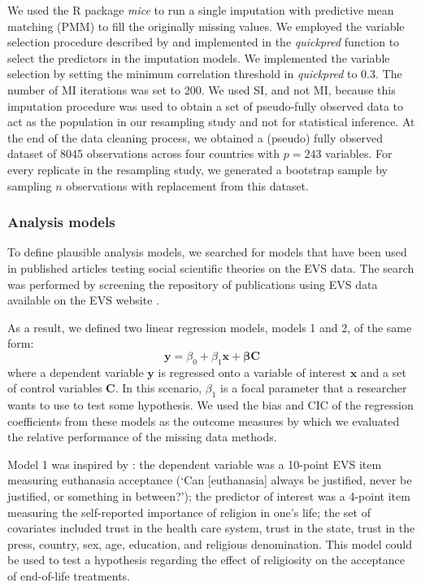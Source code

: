 	We used the R package \emph{mice} to run a single imputation with predictive mean matching (PMM) to fill the originally missing values.
	We employed the variable selection procedure described by
	\citet[][pp. 687–688]{vanBuurenEtAl:1999} and implemented in the \emph{quickpred} function to select the predictors in the imputation models. We implemented the variable selection by setting the minimum correlation threshold in \emph{quickpred} to 0.3.
	The number of MI iterations was set to 200.
	We used SI, and not MI, because this imputation procedure was used to obtain a set of pseudo-fully observed data to act as the population in our resampling study and not for statistical inference.
	At the end of the data cleaning process, we obtained a (pseudo) fully observed dataset of 8045 observations across four countries with $p = 243$ variables.
	For every replicate in the resampling study, we generated a bootstrap sample by sampling $n$ observations with replacement from this dataset.

\subsubsection{Analysis models}

	To define plausible analysis models, we searched for models that have been used in published articles
	testing social scientific theories on the EVS data.
	The search was performed by screening the repository of publications using EVS data available on the EVS 
	website \citep{EVSbib}.

	As a result, we defined two linear regression models, models 1 and 2, of the same form:
%	
	\begin{equation}
		\bm{y} = \beta_{0} + \beta_{1} \bm{x} + \bm{\beta} \bm{C}  \label{eqn:lm}
	\end{equation}
%
	where a dependent variable $\bm{y}$ is regressed onto a variable of interest $\bm{x}$ and a set of control variables $\bm{C}$.
	In this scenario, $\beta_{1}$ is a focal parameter that a researcher wants to use to test some hypothesis. We used the bias and CIC of the regression coefficients from these models as the outcome measures by which we evaluated the relative performance of the missing data methods. 

	Model 1 was inspired by \cite{koneke:2014}:
	the dependent variable was a 10-point EVS item measuring euthanasia acceptance 
	(`Can [euthanasia] always be justified, never be justified, or something in between?');
	the predictor of interest was a 4-point item measuring the self-reported importance of religion in 
	one's life;
	the set of covariates included trust in the health care system, trust in the state, 
	trust in the press, country, sex, age, education, and religious denomination.
	This model could be used to test a hypothesis regarding the 
	effect of religiosity on the acceptance of end-of-life treatments.

